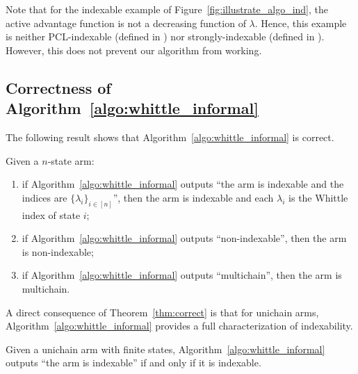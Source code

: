 \noindent Note that for the indexable example of Figure~\ref{fig:illustrate_algo_ind}, the active advantage function is not a decreasing function of $\lambda$. Hence, this example is neither PCL-indexable (defined in \cite[Definition~3]{nino2020fast}) nor strongly-indexable (defined in \cite{nakhleh2021neurwin}). However, this does not prevent our algorithm from working. 

\subsection{Correctness of Algorithm~\ref{algo:whittle_informal}}

The following result shows that Algorithm~\ref{algo:whittle_informal} is correct.

\begin{thm}
    \label{thm:correct}
    Given a $n$-state arm:
    \begin{enumerate}[label=(\roman*)]
        \item \label{it:idx_proof} if Algorithm~\ref{algo:whittle_informal} outputs ``the arm is indexable and the indices are $\{\lambda_i\}_{i\in[n]}$'', then the arm is indexable and each $\lambda_i$ is the Whittle index of state $i$;
        \item \label{it:non_idx_proof} if Algorithm~\ref{algo:whittle_informal} outputs ``non-indexable'', then the arm is non-indexable;
        \item \label{it:multi_chain} if Algorithm~\ref{algo:whittle_informal} outputs ``multichain'', then the arm is multichain.
    \end{enumerate}
\end{thm}
A direct consequence of Theorem~\ref{thm:correct} is that for unichain arms, Algorithm~\ref{algo:whittle_informal} provides a full characterization of indexability. 
\begin{cor}
    \label{coro:correct_unichain}
    Given a unichain arm with finite states, Algorithm~\ref{algo:whittle_informal} outputs ``the arm is indexable'' if and only if it is indexable. 
\end{cor}

